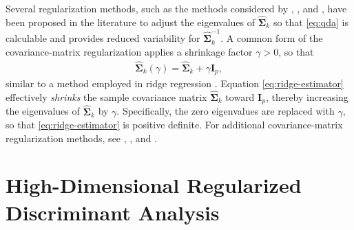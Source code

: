 \documentclass[]{interact}\usepackage[]{graphicx}\usepackage[]{color}
\begin{document}
Several regularization methods, such as the methods considered by
\cite{Xu:2009fl}, \cite{Guo:2007te}, and \cite{Mkhadri:1995jp}, have been
proposed in the literature to adjust the eigenvalues of $\widehat{\bm \Sigma}_k$
so that \eqref{eq:qda} is calculable and provides reduced variability for
$\widehat{\bm \Sigma}_k^{-1}$. A common form of the covariance-matrix
regularization applies a shrinkage factor $\gamma > 0$, so that
\begin{align}
	\widehat{\bm \Sigma}_k(\gamma) = \widehat{\bm \Sigma}_k + \gamma \bm I_p, \label{eq:ridge-estimator}
\end{align}
similar to a method employed in ridge regression \citep{Hoerl:1970cd}. Equation
\eqref{eq:ridge-estimator} effectively \emph{shrinks} the sample covariance
matrix $\widehat{\bm \Sigma}_k$ toward $\bm I_p$, thereby increasing the
eigenvalues of $\widehat{\bm \Sigma}_k$ by $\gamma$. Specifically, the zero
eigenvalues are replaced with $\gamma$, so that \eqref{eq:ridge-estimator} is
positive definite. For additional covariance-matrix regularization methods, see
\cite{Ramey:2013ji}, \cite{Xu:2009fl}, and \cite{Ye:2009gd}.

\section{High-Dimensional Regularized Discriminant Analysis}
\label{sec:rda}
\end{document}
